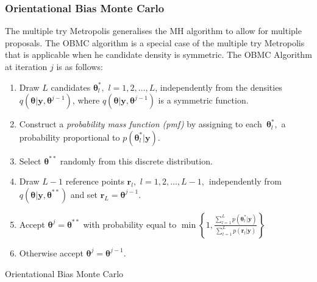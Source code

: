 \documentclass[article]{jss}
\begin{document}
\subsubsection{Orientational Bias Monte Carlo}

The multiple try Metropolis \citet{LuiLiangWong2000} generalises the
MH algorithm to allow for multiple proposals. The OBMC algorithm is a
special case of the multiple try Metropolis that is applicable when he
candidate density is symmetric. The OBMC Algorithm at iteration $j$ is
as follows:

%
\begin{algorithm}[H]
\begin{enumerate}
\item Draw $L$ candidates $\bm{\theta}_{l}^{\ast},$ $l=1,2,\ldots,L$,
  independently from the densities
  $q\left(\bm{\theta}|\bm{y},\bm{\theta}^{j-1}\right)$, where
  $q\left(\bm{\theta}|\bm{y},\bm{\theta}^{j-1}\right)$ is a symmetric
  function.
\item Construct a \textit{probability mass function (pmf)} by
  assigning to each\emph{\ }$\bm{\theta}_{l}^{\ast},$ a probability
  proportional to $p\left(\bm{\theta}_{l}^{\ast}|\bm{y}\right).$
\item Select $\bm{\theta}^{\ast\ast}$ randomly from this discrete distribution. 
\item Draw $L-1$ reference points $\bm{r}_{l},$
  $l=1,2,\ldots,L-1$,\textbf{\ }independently from
  $q\left(\bm{\theta}|\bm{y},\bm{\theta}^{\ast\ast}\right)$ and set
  $\bm{r}_{L}=\bm{\theta}^{j-1}.$
\item Accept $\bm{\theta}^{j}=\bm{\theta}^{\ast\ast}$ with probability
  equal to $\min\left\{
    1,\frac{\sum_{l=1}^{L}p\left(\bm{\theta}_{l}^{\ast}|\bm{y}\right)}{\sum_{l=1}^{L}p\left(\bm{r}_{l}|\bm{y}\right)}\right\}
  $
\item Otherwise accept $\bm{\theta}^{j}=\bm{\theta}^{j-1}.$
\end{enumerate}
\caption{Orientational Bias Monte Carlo}
\label{alg:obmc}
\end{algorithm}
\end{document}
